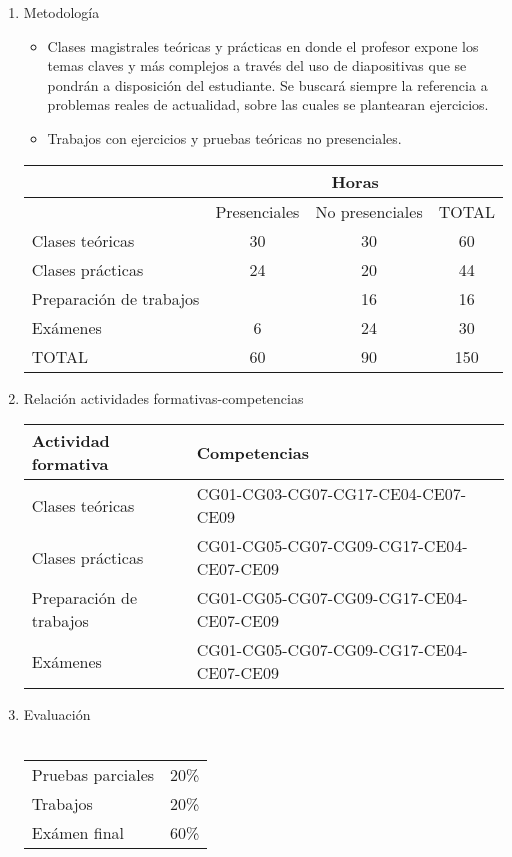 \documentclass{article}\usepackage[]{graphicx}\usepackage[]{color}
\begin{document}
\begin{enumerate}
  \item Metodología
    \begin{itemize}
      \item Clases magistrales teóricas y prácticas en donde el profesor expone los temas claves y más complejos a través del uso de diapositivas que se pondrán a disposición del estudiante. Se buscará siempre la referencia a problemas reales de actualidad, sobre las cuales se plantearan ejercicios.
      \item Trabajos con ejercicios y pruebas teóricas no presenciales.
  \end{itemize}
  
  \begin{center}
  \begin{tabular}{ l  c  c  c }
  \hline
  & \multicolumn{3}{c}{Horas}\\
    \hline
      &Presenciales &No presenciales &TOTAL\\ \hline
    Clases teóricas &30 &30 &60\\
    Clases prácticas &24 &20 &44\\
    Preparación de trabajos & &16 &16\\
    Exámenes &6 &24 &30\\ \hline
    TOTAL &60 &90 &150\\ \hline
  \end{tabular}
\end{center}
      
      \item Relación actividades formativas-competencias
  \begin{center}
  \begin{tabular}{ l  l }
    \hline
    Actividad formativa &Competencias\\ \hline
    Clases teóricas &CG01-CG03-CG07-CG17-CE04-CE07-CE09\\
    Clases prácticas &CG01-CG05-CG07-CG09-CG17-CE04-CE07-CE09\\
    Preparación de trabajos &CG01-CG05-CG07-CG09-CG17-CE04-CE07-CE09\\
    Exámenes &CG01-CG05-CG07-CG09-CG17-CE04-CE07-CE09\\ \hline
  \end{tabular}
\end{center}
      
      \item Evaluación\\ 
      \\
  \begin{left}
  \begin{tabular}{ l  l }
    Pruebas parciales &20\%\\
    Trabajos &20\%\\
    Exámen final &60\%
  \end{tabular}
\end{left}


\end{enumerate}
\end{document}

